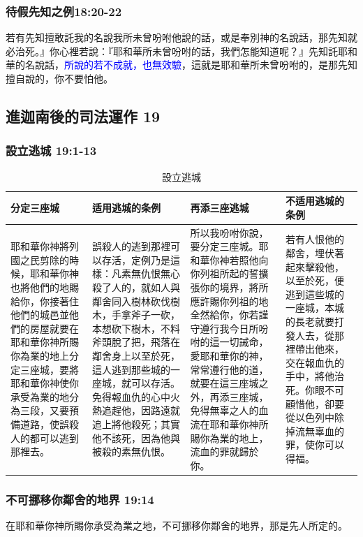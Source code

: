 \subsubsection{待假先知之例18:20-22 }
若有先知擅敢託我的名說我所未曾吩咐他說的話，或是奉別神的名說話，那先知就必治死。』你心裡若說：『耶和華所未曾吩咐的話，我們怎能知道呢？』先知託耶和華的名說話，\textcolor{blue}{所說的若不成就，也無效驗}，這就是耶和華所未曾吩咐的，是那先知擅自說的，你不要怕他。

\subsection{進迦南後的司法運作 19}
\subsubsection{設立逃城 19:1-13}
\begin{table}[H]
\begin{center}
\begin{tabular}{ p{3.55cm}|p{4.7cm}|p{4.50cm}|p{3.25cm}} \toprule
分定三座城&适用逃城的条例&再添三座逃城&不适用逃城的条例\\\hline
耶和華你神將列國之民剪除的時候，耶和華你神也將他們的地賜給你，你接著住他們的城邑並他們的房屋就要在耶和華你神所賜你為業的地上分定三座城，要將耶和華你神使你承受為業的地分為三段，又要預備道路，使誤殺人的都可以逃到那裡去。&誤殺人的逃到那裡可以存活，定例乃是這樣：凡素無仇恨無心殺了人的，就如人與鄰舍同入樹林砍伐樹木，手拿斧子一砍，本想砍下樹木，不料斧頭脫了把，飛落在鄰舍身上以至於死，這人逃到那些城的一座城，就可以存活。免得報血仇的心中火熱追趕他，因路遠就追上將他殺死；其實他不該死，因為他與被殺的素無仇恨。 &所以我吩咐你說，要分定三座城。耶和華你神若照他向你列祖所起的誓擴張你的境界，將所應許賜你列祖的地全然給你，你若謹守遵行我今日所吩咐的這一切誡命，愛耶和華你的神，常常遵行他的道，就要在這三座城之外，再添三座城，免得無辜之人的血流在耶和華你神所賜你為業的地上，流血的罪就歸於你。&若有人恨他的鄰舍，埋伏著起來擊殺他，以至於死，便逃到這些城的一座城，本城的長老就要打發人去，從那裡帶出他來，交在報血仇的手中，將他治死。你眼不可顧惜他，卻要從以色列中除掉流無辜血的罪，使你可以得福。\\\hline
\end{tabular}
\end{center}
\caption{設立逃城}
\end{table}


\subsubsection{不可挪移你鄰舍的地界 19:14 }
在耶和華你神所賜你承受為業之地，不可挪移你鄰舍的地界，那是先人所定的。

